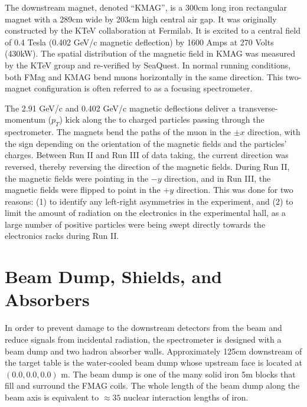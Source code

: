 The downstream magnet, denoted ``KMAG'', is a 300cm long iron rectangular magnet with a 289cm wide by 203cm high central air gap.  It was originally constructed by the KTeV collaboration\cite{PhysRevD.67.012005} at Fermilab.  It is excited to a central field of 0.4 Tesla (0.402 GeV/c magnetic deflection) by 1600 Amps at 270 Volts (430kW).  The spatial distribution of the magnetic field in KMAG was measured by the KTeV group and re-verified by SeaQuest.  In normal running conditions, both FMag and KMAG bend muons horizontally in the same direction. This two-magnet configuration is often referred to as a focusing spectrometer.

The 2.91 GeV/c and 0.402 GeV/c magnetic deflections deliver a transverse-momentum ($p_T$) kick along the to charged particles passing through the spectrometer. The magnets bend the paths of the muon in the $\pm x$ direction, with the sign depending on the orientation of the magnetic fields and the particles' charges. Between Run II and Run III of data taking, the current direction was reversed, thereby reversing the direction of the magnetic fields. During Run II, the magnetic fields were pointing in the $-y$ direction, and in Run III, the magnetic fields were flipped to point in the $+y$ direction. This was done for two reasons: (1) to identify any left-right asymmetries in the experiment, and (2) to limit the amount of radiation on the electronics in the experimental hall, as a large number of positive particles were being swept directly towards the electronics racks during Run II.


\section{Beam Dump, Shields, and Absorbers}

In order to prevent damage to the downstream detectors from the beam and reduce signals from incidental radiation, the spectrometer is designed with a beam dump and two hadron absorber walls. Approximately 125cm downstream of the target table is the water-cooled beam dump whose upstream face is located at $(0.0, 0.0, 0.0)$ m. The beam dump is one of the many solid iron 5m blocks that fill and surround the FMAG coils. The whole length of the beam dump along the beam axis is equivalent to $\approx 35$ nuclear interaction lengths of iron. 

